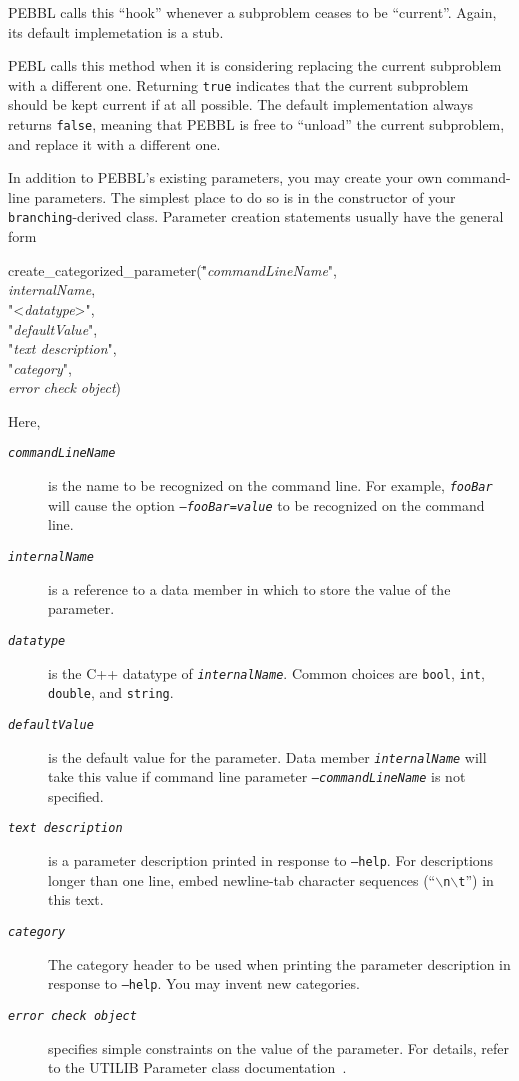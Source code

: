 PEBBL calls this ``hook'' whenever a subproblem ceases to be
``current''.  Again, its default implemetation is a stub.

PEBL calls this method when it is considering replacing the current
subproblem with a different one.  Returning \texttt{true} indicates
that the current subproblem should be kept current if at all possible.
The default implementation always returns \texttt{false}, meaning that
PEBBL is free to ``unload'' the current subproblem, and replace it
with a different one.

In addition to PEBBL's
existing parameters, you may create your own command-line parameters.
The simplest place to do so is in the constructor of your
\texttt{branching}-derived class.  Parameter creation statements
usually have the general form
\begin{codeblock}
create\_categorized\_parameter(\="\emph{commandLineName}",\\
\>\emph{internalName},\\
\>"<\emph{datatype}>",\\
\>"\emph{defaultValue}",\\
\>"\emph{text description}",\\
\>"\emph{category}",\\
\>\emph{error check object})
\end{codeblock}
Here,
\begin{description}
\item[\texttt{\emph{commandLineName}}] is the name to be recognized on
  the command line.  For example, \texttt{\emph{fooBar}} will cause the
  option \texttt{--\emph{fooBar}=\emph{value}} to be recognized on the
  command line.  
\item[\texttt{\emph{internalName}}] is a reference to a data member in
  which to store the value of the parameter.
\item[\texttt{\emph{datatype}}] is the C++ datatype of
  \texttt{\emph{internalName}}.  Common choices are \texttt{bool},
  \texttt{int}, \texttt{double}, and \texttt{string}.
\item[\texttt{\emph{defaultValue}}] is the default value for the
  parameter.  Data member \texttt{\emph{internalName}} will take this
  value if command line parameter \texttt{--\emph{commandLineName}} is
  not specified.
\item[\texttt{\emph{text description}}] is a parameter description
  printed in response to \texttt{--help}.  For descriptions longer
  than one line, embed newline-tab character sequences
  (``\texttt{$\backslash$n$\backslash$t}'') in this text.
\item[\texttt{\emph{category}}] The category header to be used when
  printing the parameter description in response to \texttt{--help}.
  You may invent new categories.
\item[\texttt{\emph{error check object}}] specifies simple constraints
  on the value of the parameter.  For details, refer to the UTILIB
  Parameter class documentation~\cite{UTILIB}.
\end{description}
